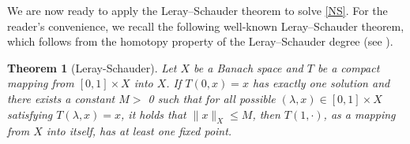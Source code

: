 \documentclass[12pt]{amsart}
\newtheorem{theorem}{Theorem}[section]
\renewcommand{\div}{{\rm div \thinspace }}
\newcommand{\Bu}{{\boldsymbol{u}}}
\newcommand{\Bf}{{\boldsymbol{f}}}
\begin{document}
We are now ready to  apply the Leray–Schauder theorem to solve \eqref{NS}.
For the reader's convenience, we recall the following well-known Leray–Schauder theorem, which follows from the homotopy property of the Leray–Schauder degree (see \cite[Theorem 7.12]{Tsai18}).
\begin{theorem}
	[Leray-Schauder]\label{lem:Leray-Schauder}
	Let $X$ be a Banach space and $T$ be a compact mapping from $ [0, 1]\times X $ into $X$. If
	$T (0,x) = x$ has exactly one solution and there exists a constant $M>$  0 such that for all possible $(\lambda, x) \in 
	[0,1] \times  X$ satisfying $T ( \lambda, x) = x$, it holds that 
	$\|x\|_{X}\leq M$, then $T ( 1,\cdot)$, as a mapping from $X$ into
	itself, has at least one fixed point.   
\end{theorem}
\end{document}
